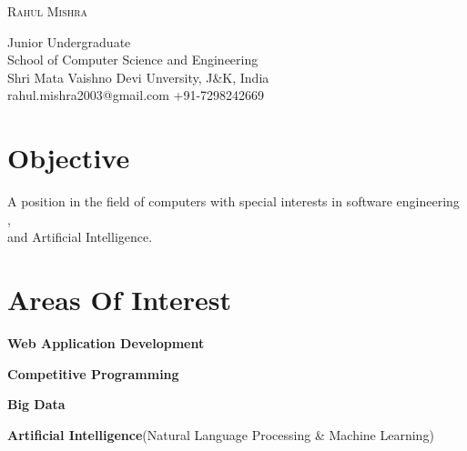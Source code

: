 \documentclass[a4paper, oneside, final]{scrartcl} %
\begin{document}
\begin{center} %


{\fontsize{24}{24}\selectfont\scshape Rahul Mishra} %
\begin{center}%
Junior Undergraduate\\
School of Computer Science and Engineering\\
Shri Mata Vaishno Devi Unversity, J\&K, India\\
{\Large\Letter} rahul.mishra2003@gmail.com\space{}\space{}   {\Large\Telefon} +91-7298242669 \\
\end{center}

\vspace{0.5cm} %


\section{Objective}

A position in the field of computers with special interests in software engineering , \\ and Artificial Intelligence.

\section{Areas Of Interest}
\begin{description}[leftmargin=\dimexpr 26pt-.5in]
\setlength{\itemindent}{.75in}
  \item[$\bullet$]  {\bfseries Web Application Development}
  \item[$\bullet$]  {\bfseries Competitive Programming}
  \item[$\bullet$]  {\bfseries Big Data}
  \item[$\bullet$]  {\bfseries Artificial Intelligence}(Natural Language Processing \& Machine Learning)
  

\end{description}
\end{center}
\end{document}
